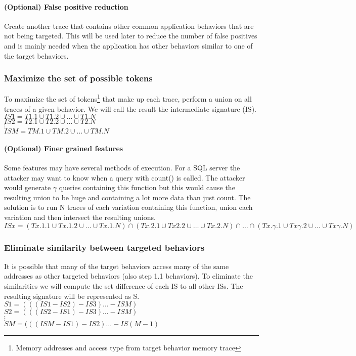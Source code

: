 \documentclass[11pt,a4paper, titlepage, oneside]{article}
\begin{document}
\paragraph{(Optional) False positive reduction}
Create another trace that contains other common application behaviors that are not being targeted. This will be used later to reduce the number of false positives and is mainly needed when the application has other behaviors similar to one of the target behaviors.

\subsubsection{Maximize the set of possible tokens}
To maximize the set of tokens\footnote{Memory addresses and access type from target behavior memory trace} that make up each trace, perform a union on all traces of a given behavior.  We will call the result the intermediate signature (IS). \\
$IS1 = T1.1\cup T1.2\cup\ldots\cup T1.N$ \\
$IS2 = T2.1\cup T2.2\cup\ldots\cup T2.N$ \\
$\vdots$ \\
$ISM = TM.1\cup TM.2\cup\ldots\cup TM.N$ 

\paragraph{(Optional) Finer grained features}
Some features may have several methods of execution. For a SQL server the attacker may want to know when a query with count() is called. The attacker would generate $\gamma$ queries containing this function but this would cause the resulting union to be huge and containing a lot more data than just count. The solution is to run N traces of each variation containing this function, union each variation and then intersect the resulting unions. \\
$ISx = (Tx.1.1\cup Tx.1.2\cup\ldots\cup Tx.1.N)\cap(Tx.2.1\cup Tx2.2\cup\ldots\cup Tx.2.N)\cap\ldots\cap(Tx.\gamma.1\cup Tx\gamma.2\cup\ldots\cup Tx\gamma.N)$

\subsubsection{Eliminate similarity between targeted behaviors}
It is possible that many of the target behaviors access many of the same addresses as other targeted behaviors (also step 1.1 behaviors). To eliminate the similarities we will compute the set difference of each IS to all other ISs. The resulting signature will be represented as S. \\
$S1 = (((IS1 - IS2) - IS3)\ldots - ISM)$ \\
$S2 = (((IS2 - IS1) - IS3)\ldots - ISM)$ \\
$\vdots$ \\
$SM = (((ISM - IS1) - IS2)\ldots - IS(M-1)$ 
\end{document}
